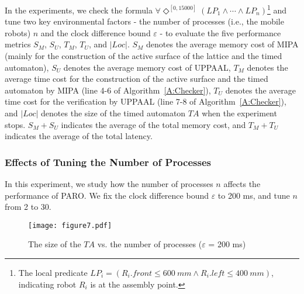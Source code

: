 \documentclass[10pt,conference,compsocconf,letterpaper]{IEEEtran}
\begin{document}
In the experiments, we check the formula $\forall \Diamond^{[0, 15000]} (LP_1\wedge \cdots \wedge LP_n)$\footnote{The local predicate $LP_i = (R_i.front \leq 600~mm \wedge R_i.left \leq 400~mm)$, indicating robot $R_i$ is at the assembly point.} and tune two key environmental factors - the number of processes (i.e., the mobile robots) $n$ and the clock difference bound $\varepsilon$ - to evaluate the five performance metrics $S_M$, $S_U$, $T_M$, $T_U$, and $|Loc|$. $S_M$ denotes the average memory cost of MIPA (mainly for the construction of the active surface of the lattice and the timed automaton), $S_U$ denotes the average memory cost of UPPAAL, $T_M$ denotes the average time cost for the construction of the active surface and the timed automaton by MIPA (line 4-6 of Algorithm~\ref{A:Checker}), $T_U$ denotes the average time cost for the verification by UPPAAL (line 7-8 of Algorithm~\ref{A:Checker}), and $|Loc|$ denotes the size of the timed automaton $TA$ when the experiment stops. $S_M + S_U$ indicates the average of the total memory cost, and $T_M + T_U$ indicates the average of the total latency.


\subsubsection{Effects of Tuning the Number of Processes}

In this experiment, we study how the number of processes $n$ affects the performance of \textsf{PARO}. We fix the clock difference bound $\varepsilon$ to 200 ms, and tune $n$ from 2 to 30.
\begin{figure}[tbp]
\begin{center}
  \texttt{[image: figure7.pdf]}
  \caption{The size of the $TA$ vs. the number of processes ($\varepsilon$ = 200 ms)}
  \label{F:size TA np}
\end{center}
\end{figure}
\end{document}
